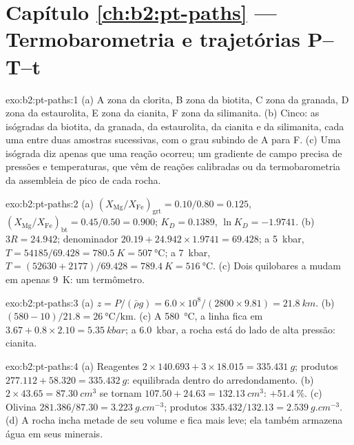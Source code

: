 \section*{Capítulo \ref{ch:b2:pt-paths} --- Termobarometria e trajetórias P--T--t}

\begin{solution}{exo:b2:pt-paths:1}
(a) A zona da clorita, B zona da biotita, C zona da granada, D zona da estaurolita, E zona da cianita,
F zona da silimanita. (b) Cinco: as isógradas da biotita, da granada, da estaurolita, da cianita e da silimanita,
cada uma entre duas amostras sucessivas, com o grau subindo de A para F. (c) Uma isógrada
diz apenas que uma reação ocorreu; um gradiente de campo precisa de pressões e temperaturas, que
vêm de reações calibradas ou da termobarometria da assembleia de pico de cada
rocha.
\end{solution}

\begin{solution}{exo:b2:pt-paths:2}
(a) $(X_{\text{Mg}}/X_{\text{Fe}})_{\text{grt}} = 0.10/0.80 = 0.125$,
$(X_{\text{Mg}}/X_{\text{Fe}})_{\text{bt}} = 0.45/0.50 = 0.900$; $K_D = 0.1389$, $\ln K_D =
-1.9741$. (b) $3R = 24.942$; denominador $20.19 + 24.942\times1.9741 = 69.428$; a
\qty{5}{kbar}, $T = 54185/69.428 = \qty{780.5}{K} = \qty{507}{\celsius}$; a
\qty{7}{kbar}, $T = (52630 + 2177)/69.428 = \qty{789.4}{K} = \qty{516}{\celsius}$.
(c) Dois quilobares a mudam em apenas \qty{9}{K}: um termômetro.
\end{solution}

\begin{solution}{exo:b2:pt-paths:3}
(a) $z = P/(\bar\rho g) = 6.0\times10^8/(2800\times9.81) = \qty{21.8}{km}$.
(b) $(580 - 10)/21.8 = \qty{26}{\celsius\per\km}$. (c) A \qty{580}{\celsius}, a linha
fica em $3.67 + 0.8\times2.10 = \qty{5.35}{kbar}$; a \qty{6.0}{kbar}, a rocha está do
lado de alta pressão: cianita.
\end{solution}

\begin{solution}{exo:b2:pt-paths:4}
(a) Reagentes $2\times140.693 + 3\times18.015 = \qty{335.431}{g}$; produtos $277.112 +
58.320 = \qty{335.432}{g}$: equilibrada dentro do arredondamento. (b) $2\times43.65 =
\qty{87.30}{cm^3}$ se tornam $107.50 + 24.63 = \qty{132.13}{cm^3}$: $+\qty{51.4}{\percent}$.
(c) Olivina $281.386/87.30 = \qty{3.223}{g.cm^{-3}}$; produtos $335.432/132.13 =
\qty{2.539}{g.cm^{-3}}$. (d) A rocha incha metade de seu volume e fica mais leve; ela
também armazena água em seus minerais.
\end{solution}

